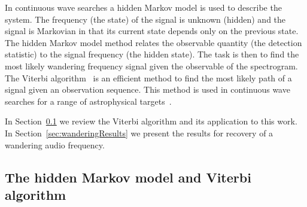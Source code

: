 \documentclass[paper-main.tex]{subfiles}
\begin{document}
In continuous wave searches a hidden Markov model is used to describe the system. 
The frequency (the state) of the signal is unknown (hidden) and the signal is Markovian in that its current state depends only on the previous state. 
The hidden Markov model method relates the observable quantity (the detection statistic) to the signal frequency (the hidden state). 
The task is then to find the most likely wandering frequency signal given the observable of the spectrogram. 
The Viterbi algorithm~\cite{Viterbi:1967} is an efficient method to find the most likely path of a signal given an observation sequence. 
This method is used in continuous wave searches for a range of astrophysical targets~\cite{ScoX1O2Viterbi:2019,ScoX1ViterbiO1:2017,MillhouseStrangMelatos:2020,JonesSun:2020,MiddletonEtAlO2LMXBs:2020,PostMergerRemnantSearch:2019,SunEtAlSNR:2018,viterbi_application}. 
 



In Section~\ref{sec:viterbi} we review the Viterbi algorithm and its application to this work. 
In Section~\ref{sec:wanderingResults} we present the results for recovery of a wandering audio frequency. 




\subsection{The hidden Markov model and Viterbi algorithm}
\label{sec:viterbi}
\end{document}
